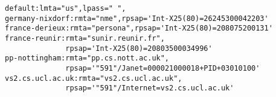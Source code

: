 {\small
\begin{verbatim}
default:lmta="us",lpass=" ",
germany-nixdorf:rmta="nme",rpsap='Int-X25(80)=26245300042203'
france-derieux:rmta="persona",rpsap='Int-X25(80)=208075200131'
france-reunir:rmta="sunir.reunir.fr",
              rpsap='Int-X25(80)=20803500034996'
pp-nottingham:rmta="pp.cs.nott.ac.uk",
              rpsap='"591"/Janet=000021000018+PID+03010100'
vs2.cs.ucl.ac.uk:rmta="vs2.cs.ucl.ac.uk",
              rpsap='"591"/Internet=vs2.cs.ucl.ac.uk'
\end{verbatim} }
